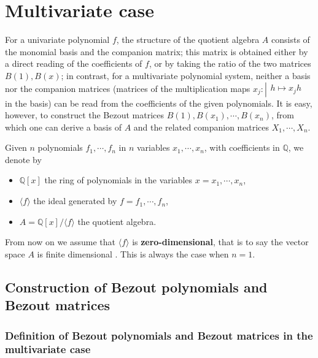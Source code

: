 \documentclass{standalone}
\begin{document}
\section{Multivariate case}
\label{multivariate}

For a univariate polynomial $f$, the structure of the quotient algebra $A$ consists of the monomial basis and the companion matrix; this matrix is obtained either by a direct reading of the coefficients of $f$, or by taking the ratio of the two matrices $B(1), B(x)$; in contrast, for a multivariate polynomial system, neither a basis nor the companion matrices (matrices of the multiplication maps
$x_j : \left\vert
\begin{array}{c}
h \mapsto x_jh
\end{array}
\right.$ in the basis) can be read from the coefficients of the given polynomials. It is easy, however, to construct the Bezout matrices $B(1), B(x_1), \cdots, B(x_n)$, from which one can derive a basis of $A$ and the related companion matrices $X_1,\cdots, X_n$. 

Given $n$ polynomials $f_1,\cdots, f_n$ in $n$ variables $x_1,\cdots, x_n$, with coefficients in $\mathbb{Q}$, we denote by
\begin{itemize}
\item $\mathbb{Q}[x]$ the ring of polynomials in the variables $x = x_1,\cdots, x_n$,
\item $\langle f \rangle$ the ideal generated by $f = f_1,\cdots, f_n$,
\item $A = \mathbb{Q}[x]/\langle f\rangle$ the quotient algebra.
\end{itemize}
From now on we assume that $\langle f\rangle$ is {\bf zero-dimensional}, that is to say the vector space $A$ is finite dimensional \cite[p.~234]{clo}. This is always the case when $n = 1$.

\subsection{Construction of Bezout polynomials and Bezout matrices}

\subsubsection{Definition of Bezout polynomials and Bezout matrices in the multivariate case}
\end{document}
